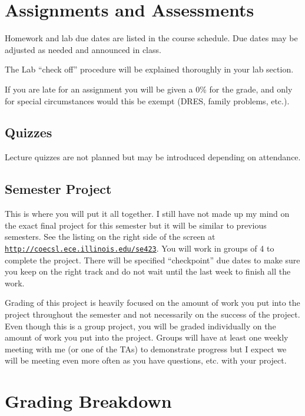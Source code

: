 \documentclass[11pt]{article}
\begin{document}
\section*{Assignments and Assessments}

Homework and lab due dates are listed in the course schedule. Due dates may be adjusted as needed and announced in class.
\par
The Lab ``check off” procedure will be explained thoroughly in your lab section.
\par
If you are late for an assignment you will be given a 0\% for the grade, and only for special circumstances would this be exempt (DRES, family problems, etc.).

\subsection*{Quizzes}
Lecture quizzes are not planned but may be introduced depending on attendance.

\subsection*{Semester Project}

This is where you will put it all together. I still have not made up my mind on the exact final project for this semester but it will be similar to previous semesters. See the listing on the right side of the screen at \href{http://coecsl.ece.illinois.edu/se423}{\nolinkurl{http://coecsl.ece.illinois.edu/se423}}. You will work in groups of 4 to complete the project. There will be specified ``checkpoint” due dates to make sure you keep on the right track and do not wait until the last week to finish all the work.
\par
Grading of this project is heavily focused on the amount of work you put into the project throughout the semester and not necessarily on the success of the project. Even though this is a group project, you will be graded individually on the amount of work you put into the project. Groups will have at least one weekly meeting with me (or one of the TAs) to demonstrate progress but I expect we will be meeting even more often as you have questions, etc. with your project.

\section*{Grading Breakdown}
\end{document}
